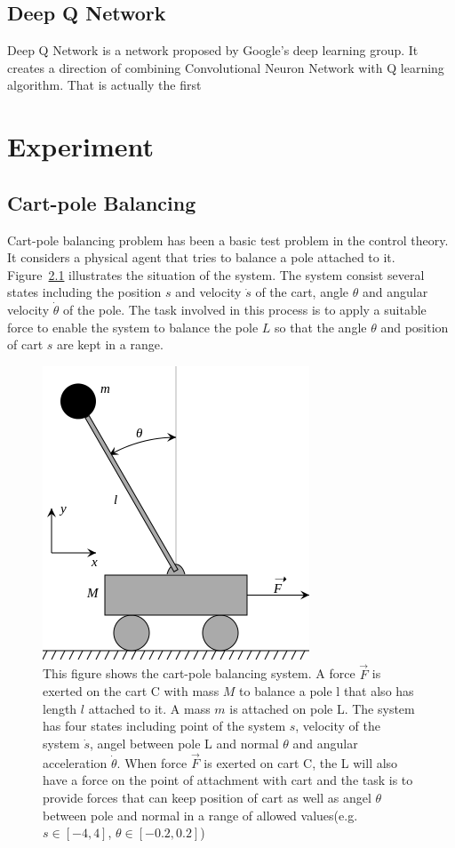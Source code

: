 \documentclass[officiallayout]{tktla}
\begin{document}
\section{Deep Q Network}
Deep Q Network is a network proposed by Google's deep learning group. It creates a direction of combining Convolutional Neuron Network with Q learning algorithm\cite{mnih2013playing}\cite{mnih2015human}. 
That is actually the first 



\chapter{Experiment}

\section{Cart-pole Balancing}
Cart-pole balancing problem has been a basic test problem in the control theory. It considers a physical agent that tries to balance a pole attached to it. Figure~\ref{cart_pendulum} illustrates the situation of the system. The system consist several states including the position $s$ and velocity $\dot{s}$ of the cart, angle $\theta$ and angular velocity $\dot{\theta}$ of the pole. The task involved in this process is to apply a suitable force to enable the system to balance the pole $L$ so that the angle $\theta$ and position of cart $s$ are kept in a range.
\begin{figure}[ht]
\centering
\includegraphics[scale=0.5]{cart_pendulum}
\caption{This figure shows the cart-pole balancing system. A force $\vec{F}$ is exerted on the cart C with mass $M$ to balance a pole l that also has length $l$ attached to it. A mass $m$ is attached on pole L. The system has four states including point of the system $s$, velocity of the system $\dot{s}$, angel between pole L and normal $\theta$ and angular acceleration $ \dot{\theta}$. When force $\vec{F}$ is exerted on cart C, the L will also have a force on the point of attachment with cart and the task is to provide forces that can keep position of cart as well as angel $\theta$ between pole and normal in a range of allowed values(e.g. $s \in [-4,4]$, $\theta \in [-0.2, 0.2]$)}
\label{cart_pendulum}
\end{figure}
\end{document}

